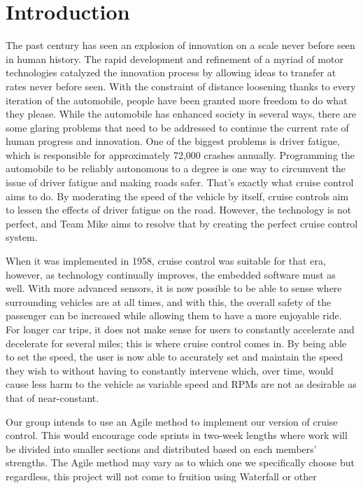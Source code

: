 \documentclass[preprint,11pt,3p]{article}
\begin{document}
\section {Introduction}
The past century has seen an explosion of innovation on a scale never before seen
in human history. The rapid development and refinement of a myriad of motor
technologies catalyzed the innovation process by allowing ideas to transfer at
rates never before seen. With the constraint of distance loosening thanks to
every iteration of the automobile, people have been granted more freedom to
do what they please. While the automobile has enhanced society in several
ways, there are some glaring problems that need to be addressed to continue
the current rate of human progress and innovation. One of the biggest problems
is driver fatigue, which is responsible for approximately 72,000 crashes annually.
Programming the automobile to be reliably autonomous to a degree is one way
to circumvent the issue of driver fatigue and making roads safer. That’s exactly
what cruise control aims to do. By moderating the speed of the vehicle by itself,
cruise controls aim to lessen the effects of driver fatigue on the road. However,
the technology is not perfect, and Team Mike aims to resolve that by creating
the perfect cruise control system. \par
When it was implemented in 1958, cruise control was suitable for that era,
however, as technology continually improves, the embedded software must as
well. With more advanced sensors, it is now possible to be able to sense where
surrounding vehicles are at all times, and with this, the overall safety of the
passenger can be increased while allowing them to have a more enjoyable ride.
For longer car trips, it does not make sense for users to constantly accelerate
and decelerate for several miles; this is where cruise control comes in. By being
able to set the speed, the user is now able to accurately set and maintain the
speed they wish to without having to constantly intervene which, over time,
would cause less harm to the vehicle as variable speed and RPMs are not as
desirable as that of near-constant. \par
Our group intends to use an Agile method to implement our version of cruise
control. This would encourage code sprints in two-week lengths where work
will be divided into smaller sections and distributed based on each members’
strengths. The Agile method may vary as to which one we specifically choose
but regardless, this project will not come to fruition using Waterfall or other
\end{document}

